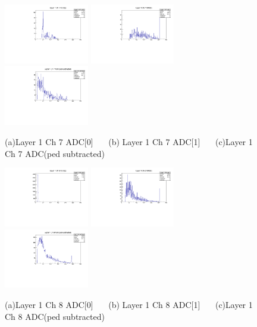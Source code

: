 \documentclass[a4paper,11pt]{article}
\theoremstyle{mytheor}
\begin{document}
\begin{figure}[H] 
\vspace*{-0.3cm} 
\includegraphics[width=0.33\textwidth,scale=0.5,trim=0 0 0 0,clip]{plotsdir/file0_muons-Layer1_Ch7_adc0-1.pdf} 
\includegraphics[width=0.33\textwidth,scale=0.5,trim=0 0 0 0,clip]{plotsdir/file0_muons-Layer1_Ch7_adc1-1.pdf} 
\includegraphics[width=0.33\textwidth,scale=0.5,trim=0 0 0 0,clip]{plotsdir/file0_muons-Layer1_Ch7_adcPedsub-1.pdf} 
\caption{(a)Layer 1 Ch 7 ADC[0] ~~~(b) Layer 1 Ch 7 ADC[1] ~~~(c)Layer 1 Ch 7 ADC(ped subtracted) } 
\end{figure} 
\begin{figure}[H] 
\vspace*{-0.3cm} 
\includegraphics[width=0.33\textwidth,scale=0.5,trim=0 0 0 0,clip]{plotsdir/file0_muons-Layer1_Ch8_adc0-1.pdf} 
\includegraphics[width=0.33\textwidth,scale=0.5,trim=0 0 0 0,clip]{plotsdir/file0_muons-Layer1_Ch8_adc1-1.pdf} 
\includegraphics[width=0.33\textwidth,scale=0.5,trim=0 0 0 0,clip]{plotsdir/file0_muons-Layer1_Ch8_adcPedsub-1.pdf} 
\caption{(a)Layer 1 Ch 8 ADC[0] ~~~(b) Layer 1 Ch 8 ADC[1] ~~~(c)Layer 1 Ch 8 ADC(ped subtracted) } 
\end{figure} 
\end{document}

